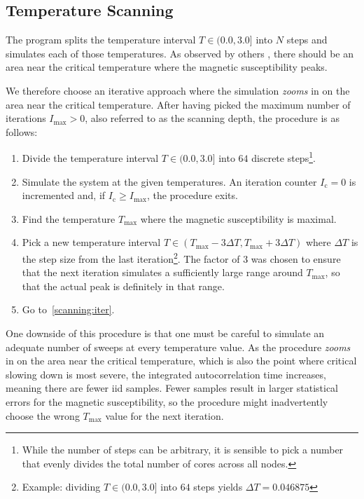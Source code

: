 \subsection{Temperature Scanning}\label{sec:impl:scanning}
	The program splits the temperature interval $T \in (0.0, 3.0]$ into $N$ steps and simulates each of those temperatures.  As observed by others \citep*{olsson_helicity}, there should be an area near the critical temperature where the magnetic susceptibility peaks.
	
	We therefore choose an iterative approach where the simulation \emph{zooms} in on the area near the critical temperature. After having picked the maximum number of iterations $I_\text{max} > 0$, also referred to as the scanning depth, the procedure is as follows:
	\begin{enumerate}
		\item \label{scanning:init} Divide the temperature interval $T \in (0.0, 3.0]$ into $64$ discrete steps\footnote{While the number of steps can be arbitrary, it is sensible to pick a number that evenly divides the total number of cores across all nodes.}.
		\item \label{scanning:iter} Simulate the system at the given temperatures. An iteration counter $I_\text{c} = 0$ is incremented and, if $I_\text{c} \geq I_\text{max}$, the procedure exits.
		\item Find the temperature $T_\text{max}$ where the magnetic susceptibility is maximal.
		\item Pick a new temperature interval $T \in (T_\text{max} - 3 \Delta T,  T_\text{max} + 3 \Delta T)$ where $\Delta T$ is the step size from the last iteration\footnote{Example: dividing $T \in (0.0, 3.0]$ into $64$ steps yields $\Delta T = \num{0.046875}$}. The factor of $3$ was chosen to ensure that the next iteration simulates a sufficiently large range around $T_\text{max}$, so that the actual peak is definitely in that range.
		\item Go to~\cref{scanning:iter}.
	\end{enumerate}
	One downside of this procedure is that one must be careful to simulate an adequate number of sweeps at every temperature value. As the procedure \emph{zooms} in on the area near the critical temperature, which is also the point where critical slowing down is most severe, the integrated autocorrelation time increases, meaning there are fewer iid samples. Fewer samples result in larger statistical errors for the magnetic susceptibility, so the procedure might inadvertently choose the wrong $T_\text{max}$ value for the next iteration.
